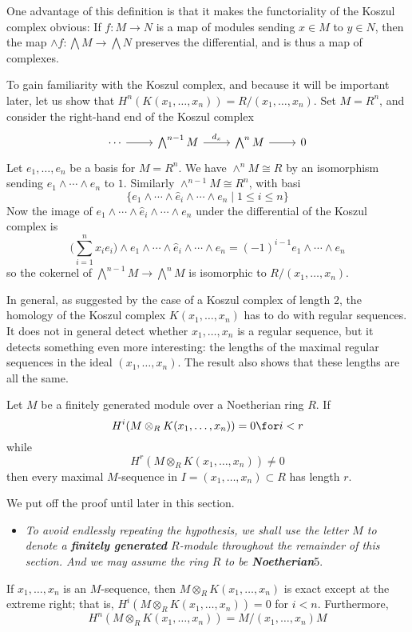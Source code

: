 One advantage of this definition is that it makes the functoriality of the
Koszul complex obvious: If $f:M\to N$ is a map of modules sending $x\in M$ to $y\in N$, then the map $\wedge f:\bigwedge M\to\bigwedge N$ preserves the differential, and is thus a map of complexes.\par
To gain familiarity with the Koszul complex, and because it will be important later, let us show that $H^n(K(x_1,\dots,x_n))=R/(x_1,\dots,x_n)$. Set $M=R^n$, and consider the right-hand end of the Koszul complex
\[\begin{tikzcd}
\cdots\ar[r]&\bigwedge^{n-1}M\ar[r,"d_x"]&\bigwedge^nM\ar[r]&0
\end{tikzcd}\]
Let $e_1,\dots,e_n$ be a basis for $M=R^n$. We have $\wedge^nM\cong R$ by an isomorphism sending $e_1\wedge\cdots\wedge e_n$ to $1$. Similarly $\wedge^{n-1}M\cong R^n$, with basi
\[\{e_1\wedge\cdots\wedge \widehat{e}_i\wedge\cdots\wedge e_n\mid 1\leq i\leq n\}\] 
Now the image of $e_1\wedge\cdots\wedge \widehat{e}_i\wedge\cdots\wedge e_n$ under the differential of the Koszul complex is
\[\Big(\sum_{i=1}^{n}x_ie_i\Big)\wedge e_1\wedge\cdots\wedge \widehat{e}_i\wedge\cdots\wedge e_n=(-1)^{i-1}e_1\wedge\cdots\wedge e_n\]
so the cokernel of $\bigwedge^{n-1}M\to\bigwedge^nM$ is isomorphic to $R/(x_1,\dots,x_n)$.\par
In general, as suggested by the case of a Koszul complex of length $2$,
the homology of the Koszul complex $K(x_1,\dots,x_n)$ has to do with regular sequences. It does not in general detect whether $x_1,\dots,x_n$ is a regular sequence, but it detects something even more interesting: the lengths of the maximal regular sequences in the ideal $(x_1,\dots,x_n)$. The result also shows that these lengths are all the same.
\begin{theorem}\label{Koszul H^i=0}
Let $M$ be a finitely generated module over a Noetherian ring $R$. If
\[H^i(M\otimes_RK(x_1,\dots,x_n))=0\for i<r\]
while
\[H^r(M\otimes_RK(x_1,\dots,x_n))\neq 0\]
then every maximal $M$-sequence in $I=(x_1,\dots,x_n)\subset R$ has length $r$.
\end{theorem}
We put off the proof until later in this section.
\begin{itemize}
\item \textit{To avoid endlessly repeating the hypothesis, we shall use the letter $M$ to denote a \textbf{finitely generated} $R$-module throughout the remainder of this section. And we may assume the ring $R$ to be \textbf{Noetherian}}5.
\end{itemize}
\begin{corollary}\label{Koszul reg seq exact}
If $x_1,\dots,x_n$ is an $M$-sequence, then $M\otimes_RK(x_1,\dots,x_n)$
is exact except at the extreme right; that is, $H^i(M\otimes_RK(x_1,\dots,x_n))=0$ for $i<n$. Furthermore, 
\[H^n(M\otimes_RK(x_1,\dots,x_n))=M/(x_1,\dots,x_n)M\]
\end{corollary}
